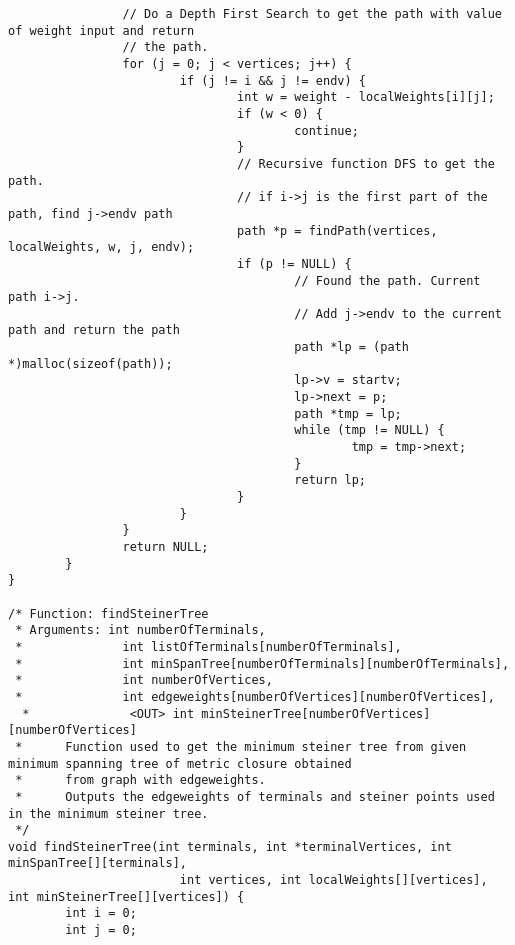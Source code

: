 \documentclass[a4paper]{article}
\begin{document}
\begin{lstlisting}
                // Do a Depth First Search to get the path with value of weight input and return
                // the path.
                for (j = 0; j < vertices; j++) {
                        if (j != i && j != endv) {
                                int w = weight - localWeights[i][j];
                                if (w < 0) {
                                        continue;
                                }
                                // Recursive function DFS to get the path.
                                // if i->j is the first part of the path, find j->endv path
                                path *p = findPath(vertices, localWeights, w, j, endv);
                                if (p != NULL) {
                                        // Found the path. Current path i->j.
                                        // Add j->endv to the current path and return the path
                                        path *lp = (path *)malloc(sizeof(path));
                                        lp->v = startv;
                                        lp->next = p;
                                        path *tmp = lp;
                                        while (tmp != NULL) {
                                                tmp = tmp->next;
                                        }
                                        return lp;
                                }
                        }
                }
                return NULL;
        }
}

/* Function: findSteinerTree
 * Arguments: int numberOfTerminals,
 *              int listOfTerminals[numberOfTerminals],
 *              int minSpanTree[numberOfTerminals][numberOfTerminals],
 *              int numberOfVertices,
 *              int edgeweights[numberOfVertices][numberOfVertices],
  *              <OUT> int minSteinerTree[numberOfVertices][numberOfVertices]
 *      Function used to get the minimum steiner tree from given minimum spanning tree of metric closure obtained
 *      from graph with edgeweights.
 *      Outputs the edgeweights of terminals and steiner points used in the minimum steiner tree.
 */
void findSteinerTree(int terminals, int *terminalVertices, int minSpanTree[][terminals],
                        int vertices, int localWeights[][vertices], int minSteinerTree[][vertices]) {
        int i = 0;
        int j = 0;


\end{lstlisting}
\end{document}
